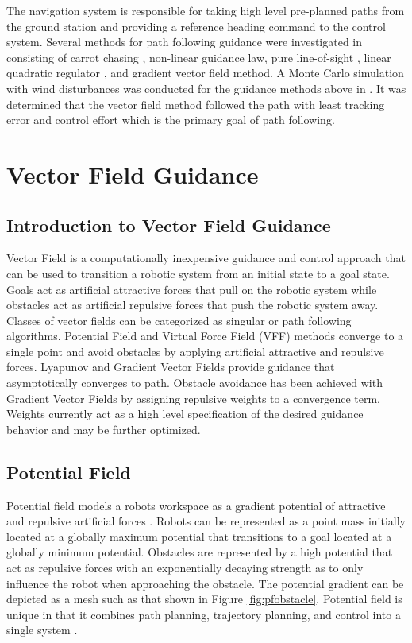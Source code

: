 \documentclass[numbered,pdftex]{ohio-etd}
\begin{document}
The navigation system is responsible for taking high level pre-planned paths from the ground station and providing a reference heading command to the control system. Several methods for path following guidance were investigated in \cite{sujit_unmanned_2014} consisting of carrot chasing \cite{manjunath_application_2016}, non-linear guidance law, pure line-of-sight \cite{fortuna_cascaded_2015}, linear quadratic regulator \cite{capello_simulation-based_2012}, and gradient vector field method. A Monte Carlo simulation with wind disturbances was conducted for the guidance methods above in \cite{sujit_unmanned_2014}. It was determined that the vector field method followed the path with least tracking error and control effort which is the primary goal of path following. 


\section{Vector Field Guidance}
\subsection{Introduction to Vector Field Guidance}
 Vector Field is a computationally inexpensive guidance and control approach that can be used to transition a robotic system from an initial state to a goal state. Goals act as artificial attractive forces that pull on the robotic system while obstacles act as artificial repulsive forces that push the robotic system away. Classes of vector fields can be categorized as singular or path following algorithms. Potential Field and Virtual Force Field (VFF) methods converge to a single point and avoid obstacles by applying artificial attractive and repulsive forces. Lyapunov and Gradient Vector Fields provide guidance that asymptotically converges to path. Obstacle avoidance has been achieved with Gradient Vector Fields by assigning repulsive weights to a convergence term. Weights currently act as a high level specification of the desired guidance behavior and may be further optimized. 

\subsection{Potential Field}
Potential field models a robots workspace as a gradient potential of attractive and repulsive artificial forces \cite{khatib_real-time_1986}. Robots can be represented as a point mass initially located at a globally maximum potential that transitions to a goal located at a globally minimum potential. Obstacles are represented by a high potential that act as repulsive forces with an exponentially decaying strength as to only influence the robot when approaching the obstacle. The potential gradient can be depicted as a mesh such as that shown in Figure \ref{fig:pfobstacle}. Potential field is unique in that it combines path planning, trajectory planning, and control into a single system \cite{rimon_exact_1992}. 
\end{document}
